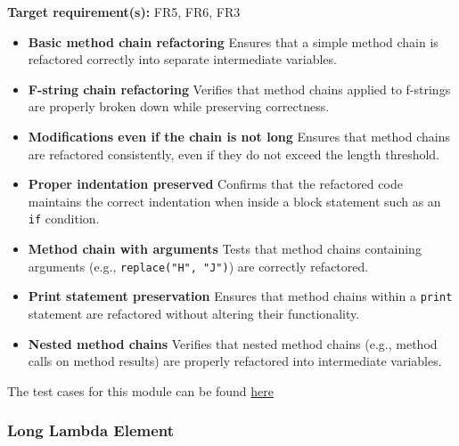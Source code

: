 \documentclass[12pt, titlepage]{article}
\begin{document}
\noindent \textbf{Target requirement(s):} FR5, FR6, FR3 ~\cite{SRS} \\

\begin{itemize}
    \item \textbf{Basic method chain refactoring} \newline
    Ensures that a simple method chain is refactored correctly into separate intermediate variables.

    \item \textbf{F-string chain refactoring} \newline
    Verifies that method chains applied to f-strings are properly broken down while preserving correctness.

    \item \textbf{Modifications even if the chain is not long} \newline
    Ensures that method chains are refactored consistently, even if they do not exceed the length threshold.

    \item \textbf{Proper indentation preserved} \newline
    Confirms that the refactored code maintains the correct indentation when inside a block statement such as an \texttt{if} condition.

    \item \textbf{Method chain with arguments} \newline
    Tests that method chains containing arguments (e.g., \texttt{replace("H", "J")}) are correctly refactored.

    \item \textbf{Print statement preservation} \newline
    Ensures that method chains within a \texttt{print} statement are refactored without altering their functionality.

    \item \textbf{Nested method chains} \newline
    Verifies that nested method chains (e.g., method calls on method results) are properly refactored into intermediate variables.
\end{itemize}

\noindent The test cases for this module can be found \href{https://github.com/ssm-lab/capstone--source-code-optimizer/blob/new-poc/tests/refactorers/test_long_element_chain.py}{here}

\subsubsection{Long Lambda Element}
\end{document}
